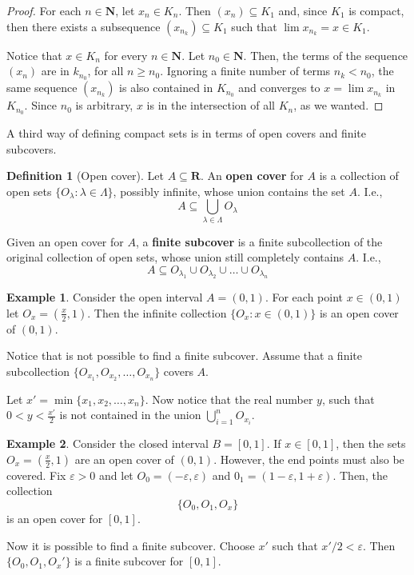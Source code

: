\documentclass[tikz,12pt,a4paper]{article}
\theoremstyle{definition}
\newtheorem{example}{Example}[section]
\newtheorem{definition}{Definition}[section]
\begin{document}
\begin{proof}
	For each $n \in \textbf{N}$, let $x_n \in K_n$. Then $(x_n) \subseteq K_1$ and, since $K_1$ is compact, then there exists a subsequence $(x_{n_k}) \subseteq K_1$ such that $\lim x_{n_k} = x \in K_1$.
	
	Notice that $x \in K_n$ for every $n \in \textbf{N}$. Let $n_0 \in \textbf{N}$. Then, the terms of the sequence $(x_n)$ are in $k_{n_0}$, for all $n \geq n_0$. Ignoring a finite number of terms $n_k < n_0$, the same sequence $(x_{n_k})$ is also contained in $K_{n_0}$ and converges to $x = \lim x_{n_k}$ in $K_{n_0}$. Since $n_0$ is arbitrary, $x$ is in the intersection of all $K_n$, as we wanted. 
\end{proof}

A third way of defining compact sets is in terms of open covers and finite subcovers. 

\begin{definition}[Open cover]
	Let $A \subseteq \textbf{R}$. An \textbf{open cover} for $A$ is a collection of open sets $\{ O_\lambda : \lambda \in \Lambda \}$, possibly infinite, whose union contains the set $A$. I.e.,
	\[
		A \subseteq \bigcup_{\lambda \in \Lambda} O_\lambda
	\]
	
	Given an open cover for $A$, a \textbf{finite subcover} is a finite subcollection of the original collection of open sets, whose union still completely contains $A$. I.e.,
	\[
		A \subseteq O_{\lambda_1} \cup O_{\lambda_2} \cup \ldots \cup O_{\lambda_n} 
	\]
\end{definition}

\begin{example}
	Consider the open interval $A = (0,1)$. For each point $x \in (0,1)$ let $O_x = \left( \frac{x}{2}, 1 \right)$. Then the infinite collection $\{ O_x : x \in (0,1) \}$ is an open cover of $(0,1)$.
	
	Notice that is not possible to find a finite subcover. Assume that a finite subcollection $\{ O_{x_1}, O_{x_2}, \ldots , O_{x_n} \}$ covers $A$.
	
	Let $x' = \min \{ x_1, x_2, \ldots, x_n \}$. Now notice that the real number $y$, such that $0 < y < \frac{x'}{2}$ is not contained in the union $\bigcup_{i=1}^n O_{x_i}$. 
\end{example}

\begin{example}
	Consider the closed interval $B = [0,1]$. If $x \in [0,1]$, then the sets $O_x = \left( \frac{x}{2}, 1 \right)$ are an open cover of $(0,1)$. However, the end points must also be covered. Fix $\varepsilon > 0$ and let $O_0 = (-\varepsilon, \varepsilon)$ and $0_1 = (1-\varepsilon, 1+\varepsilon)$. Then, the collection
	\[
		\{ O_0, O_1, O_x \}
	\]
	is an open cover for $[0,1]$.
	
	Now it is possible to find a finite subcover. Choose $x'$ such that $x'/2 < \varepsilon$. Then $\{ O_0, O_1, O_x' \}$ is a finite subcover for $[0,1]$.
\end{example}
\end{document}
